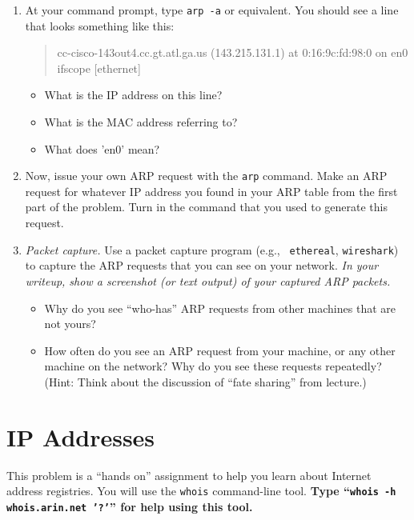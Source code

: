 \documentclass[11pt]{article}
\begin{document}
\begin{enumerate}
\item At your command prompt, type {\tt arp -a} or equivalent.  You
  should see a line that looks something like this:
\begin{quote}
cc-cisco-143out4.cc.gt.atl.ga.us (143.215.131.1) at 0:16:9c:fd:98:0 on en0 ifscope [ethernet]
\end{quote}
\begin{itemize}
\item What is the IP address on this line?  
\item What is the MAC address referring to?  
\item What does 'en0' mean?
\end{itemize}
\item Now, issue your own ARP request with the {\tt arp} command.  Make
  an ARP request for whatever IP address you found in your ARP table
  from the first part of the problem.  Turn in the command that you
  used to generate this request.
\item {\em Packet capture.} Use a packet capture program (e.g., {\tt
  ethereal}, {\tt wireshark}) to capture the ARP requests that you can
  see on your network.  {\em In your writeup, show a screenshot (or text
  output) of your captured ARP packets.}
\begin{itemize}
\item Why do you see ``who-has'' ARP requests from other machines that
  are not yours?
\item How often do you see an ARP request from your machine, or any
  other machine on the network?  Why do you see these requests
  repeatedly?  (Hint: Think about the discussion of ``fate sharing''
  from lecture.)
\end{itemize}
\end{enumerate}

\pagebreak

\section{IP Addresses}

This problem is a ``hands on'' assignment to help you learn about
Internet address registries.  You will use the {\tt whois} command-line
tool. {\bf Type ``{\tt whois -h whois.arin.net '?'}'' for help using this tool.}
\end{document}
